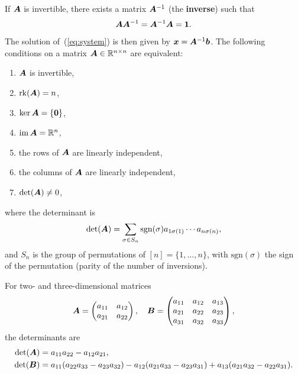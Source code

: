If $\bm{A}$ is invertible, there exists a matrix $\bm{A}^{-1}$ (the \textbf{inverse}) such that
\begin{equation*}
  \bm{A} \bm{A}^{-1} = \bm{A}^{-1}\bm{A} = \bm{1}.
\end{equation*}
The solution of~(\ref{eq:system}) is then given by $\bm{x} = \bm{A}^{-1} \bm{b}$.
The following conditions on a matrix $\bm{A}\in \mathbb{R}^{n\times n}$ are equivalent:
\begin{enumerate}
\item $\bm{A}$ is invertible,
\item $\mathrm{rk}(\bm{A})= n$,
\item $\ker \bm{A} = \{\bm{0}\}$,
\item $\operatorname{im} \bm{A} = \mathbb{R}^n$,
\item the rows of $\bm{A}$ are linearly independent,
\item the columns of $\bm{A}$ are linearly independent,
\item $\det(\bm{A})\neq 0$,
\end{enumerate}
where the determinant is
\begin{equation*}
 \det(\bm{A}) = \sum_{\sigma \in S_n} \mathrm{sgn}(\sigma) a_{1\sigma(1)}\cdots a_{n\sigma(n)},
\end{equation*}
and $S_n$ is the group of permutations of $[n]=\{1,\dots,n\}$, 
with $\mathrm{sgn}(\sigma)$ the sign of the permutation (parity of the number of inversions).
\begin{example}
 For two- and three-dimensional matrices
 \begin{equation*}
 \bm{A}=\begin{pmatrix} a_{11} & a_{12}\\ a_{21} & a_{22}\end{pmatrix}, \quad \bm{B} = \begin{pmatrix} a_{11} & a_{12} & a_{13}\\ a_{21} & a_{22} & a_{23}\\ a_{31} & a_{32} & a_{33}\end{pmatrix},
 \end{equation*}
 the determinants are
 \begin{align*}
   \det(\bm{A})&= a_{11}a_{22}-a_{12}a_{21}, \\
  \det(\bm{B}) &= a_{11}(a_{22}a_{33}-a_{23}a_{32})-a_{12}(a_{21}a_{33}-a_{23}a_{31})+a_{13}(a_{21}a_{32}-a_{22}a_{31}).
 \end{align*}
\end{example}

